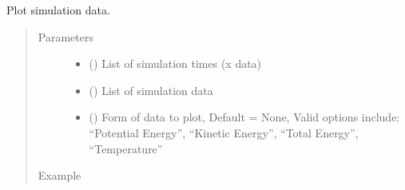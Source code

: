 \documentclass[letterpaper,12pt,english,openany,oneside]{sphinxmanual}
\begin{document}
\begin{fulllineitems}
\label{\detokenize{simulation:simulation.tools.plot_simulation_data}}
Plot simulation data.
\begin{quote}\begin{description}
\item[{Parameters}] \leavevmode\begin{itemize}
\item {} 
 () \textendash{} List of simulation times (x data)

\item {} 
 () \textendash{} List of simulation data

\item {} 
 () \textendash{} Form of data to plot, Default = None, Valid options include: “Potential Energy”, “Kinetic Energy”, “Total Energy”, “Temperature”

\end{itemize}

\item[{Example}] \leavevmode
\end{description}\end{quote}


\end{fulllineitems}
\end{document}
